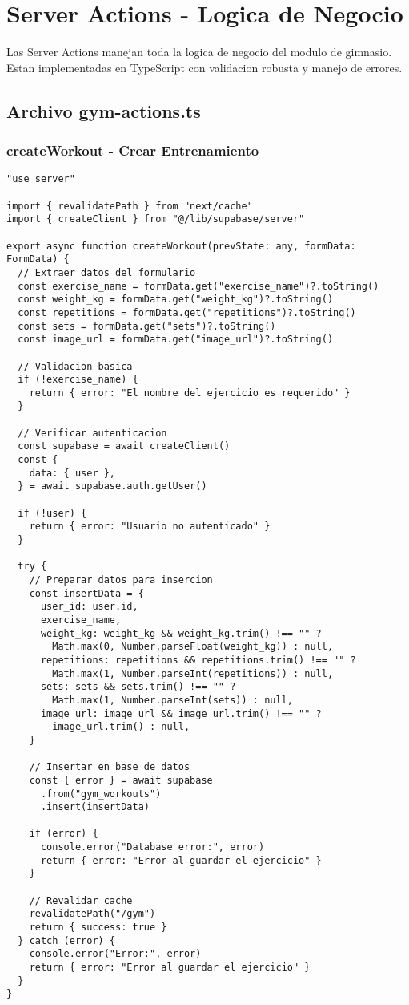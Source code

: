 \documentclass[12pt,a4paper]{article}
\begin{document}
\section{Server Actions - Logica de Negocio}

Las Server Actions manejan toda la logica de negocio del modulo de gimnasio. Estan implementadas en TypeScript con validacion robusta y manejo de errores.

\subsection{Archivo gym-actions.ts}

\subsubsection{createWorkout - Crear Entrenamiento}

\begin{lstlisting}[caption=Funcion createWorkout completa]
"use server"

import { revalidatePath } from "next/cache"
import { createClient } from "@/lib/supabase/server"

export async function createWorkout(prevState: any, formData: FormData) {
  // Extraer datos del formulario
  const exercise_name = formData.get("exercise_name")?.toString()
  const weight_kg = formData.get("weight_kg")?.toString()
  const repetitions = formData.get("repetitions")?.toString()
  const sets = formData.get("sets")?.toString()
  const image_url = formData.get("image_url")?.toString()

  // Validacion basica
  if (!exercise_name) {
    return { error: "El nombre del ejercicio es requerido" }
  }

  // Verificar autenticacion
  const supabase = await createClient()
  const {
    data: { user },
  } = await supabase.auth.getUser()

  if (!user) {
    return { error: "Usuario no autenticado" }
  }

  try {
    // Preparar datos para insercion
    const insertData = {
      user_id: user.id,
      exercise_name,
      weight_kg: weight_kg && weight_kg.trim() !== "" ? 
        Math.max(0, Number.parseFloat(weight_kg)) : null,
      repetitions: repetitions && repetitions.trim() !== "" ? 
        Math.max(1, Number.parseInt(repetitions)) : null,
      sets: sets && sets.trim() !== "" ? 
        Math.max(1, Number.parseInt(sets)) : null,
      image_url: image_url && image_url.trim() !== "" ? 
        image_url.trim() : null,
    }

    // Insertar en base de datos
    const { error } = await supabase
      .from("gym_workouts")
      .insert(insertData)

    if (error) {
      console.error("Database error:", error)
      return { error: "Error al guardar el ejercicio" }
    }

    // Revalidar cache
    revalidatePath("/gym")
    return { success: true }
  } catch (error) {
    console.error("Error:", error)
    return { error: "Error al guardar el ejercicio" }
  }
}
\end{lstlisting}
\end{document}
